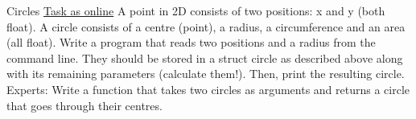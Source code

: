 \begin{frame}{Circles}
    \href{http://fsr.github.io/c-lessons/exercises/21_Circles.html}{Task as online}
    \newline
    A point in 2D consists of two positions: x and y (both float). A circle consists of a 
    centre (point), a radius, a circumference and an area (all float).
    \newline
    Write a program that reads two positions and a radius from the command line. They should
    be stored in a struct circle as described above along with its remaining parameters 
    (calculate them!). Then, print the resulting circle.
    \newline 
    \newline
    Experts: Write a function that takes two circles as arguments and returns a circle that 
    goes through their centres.

\end{frame}


